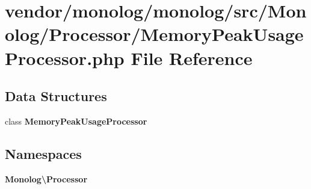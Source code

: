 \section{vendor/monolog/monolog/src/\+Monolog/\+Processor/\+Memory\+Peak\+Usage\+Processor.php File Reference}
\label{_memory_peak_usage_processor_8php}
\subsection*{Data Structures}
\begin{DoxyCompactItemize}
\item 
class {\bf Memory\+Peak\+Usage\+Processor}
\end{DoxyCompactItemize}
\subsection*{Namespaces}
\begin{DoxyCompactItemize}
\item 
 {\bf Monolog\textbackslash{}\+Processor}
\end{DoxyCompactItemize}
